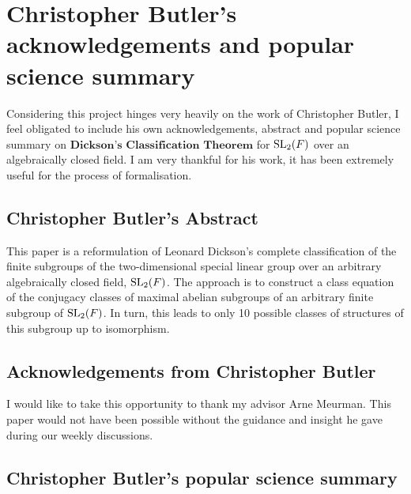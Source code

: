 \section{Christopher Butler's acknowledgements and popular science summary}

Considering this project hinges very heavily on the work of Christopher Butler, I feel obligated to include his own acknowledgements, abstract and popular science summary on $\textbf{Dickson's Classification Theorem}$ for $\operatorname{SL}_2(F)$ over an algebraically closed field. I am very thankful for his work, it has been
extremely useful for the process of formalisation.

\subsection{Christopher Butler's Abstract }

This paper is a reformulation of Leonard Dickson's complete classification of the finite subgroups of the two-dimensional special linear group over an arbitrary algebraically closed field, $\operatorname{SL}_2(F)$. The approach is to construct a class equation of the conjugacy classes of maximal abelian subgroups of an arbitrary finite subgroup of $\operatorname{SL}_2(F)$. In turn, this leads to only 10 possible classes of structures of this subgroup up to isomorphism.

\subsection{Acknowledgements from Christopher Butler}

I would like to take this opportunity to thank my advisor Arne Meurman. This paper would not have been possible without the guidance and insight he gave during our weekly discussions.


\subsection{Christopher Butler's popular science summary}

